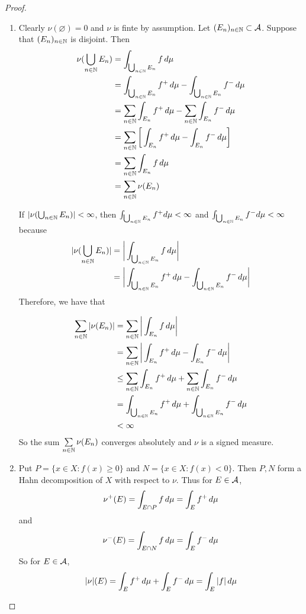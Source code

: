 \documentclass{book}
\begin{document}
	\begin{proof}
		
		\begin{enumerate}
			
			\item Clearly $\nu(\varnothing) = 0$ and $\nu$ is finte by assumption. Let $(E_n)_{n \in \mathbb{N}} \subset \mathcal{A}$. Suppose that $(E_n)_{n \in \mathbb{N}}$ is disjoint. Then 
			\begin{align*}
				\nu(\bigcup_{n \in \mathbb{N}} E_n)
				&= \int_{\bigcup_{n \in \mathbb{N}} E_n} f \, d \mu \\ 
				&= \int_{\bigcup_{n \in \mathbb{N}} E_n} f^+ \, d \mu - \int_{\bigcup_{n \in \mathbb{N}} E_n} f^- \, d \mu\\
				&= \sum\limits_{n \in \mathbb{N}} \int_{ E_n} f^+ \, d \mu - \sum\limits_{n \in \mathbb{N}} \int_{E_n} f^- \, d \mu\\
				&= \sum\limits_{n \in \mathbb{N}} \bigg[ \int_{ E_n} f^+ \, d \mu - \int_{ E_n} f^- \, d \mu \bigg]\\
				&= \sum\limits_{n \in \mathbb{N}} \int_{ E_n} f \, d \mu\\
				&= \sum\limits_{n \in \mathbb{N}} \nu(E_n)
			\end{align*}
			
			If $|\nu(\bigcup_{n \in \mathbb{N}}E_n)| < \infty$, then $ \int_{\bigcup_{n \in \mathbb{N}} E_n} f^+ d  \mu < \infty$ and $ \int_{\bigcup_{n \in \mathbb{N}} E_n} f^- d  \mu < \infty$ because
			\begin{align*}
				|\nu(\bigcup_{n \in \mathbb{N}}E_n)|
				&=\bigg |\int_{\bigcup_{n \in \mathbb{N}} E_n} f \, d \mu\bigg| \\
				&= \bigg |\int_{\bigcup_{n \in \mathbb{N}} E_n} f^+ \, d \mu - \int_{\bigcup_{n \in \mathbb{N}} E_n} f^- \, d \mu \bigg|
			\end{align*} Therefore, we have that
			
			\begin{align*}
				\sum\limits_{n \in \mathbb{N}} |\nu(E_n)|
				&=  \sum\limits_{n \in \mathbb{N}} \bigg|\int_{E_n} f \, d \mu \bigg|\\
				&= \sum\limits_{n \in \mathbb{N}} \bigg| \int_{E_n} f^+ \, d \mu -  \int_{E_n} f^- \, d \mu \bigg|\\
				& \leq \sum\limits_{n \in \mathbb{N}}  \int_{E_n} f^+ \, d \mu  + \sum\limits_{n \in \mathbb{N}}  \int_{E_n} f^- \, d \mu \\
				&= \int_{\bigcup_{n \in \mathbb{N}} E_n} f^+ \, d \mu + \int_{\bigcup_{n \in \mathbb{N}} E_n} f^- \, d \mu\\
				& < \infty
			\end{align*}
			So the sum $\sum\limits_{n \in \mathbb{N}} \nu(E_n)$ converges absolutely and $\nu$ is a signed measure. 
			
			\item Put $P = \{x \in X: f(x) \geq 0\}$ and $N = \{x \in X: f(x) < 0\}$. Then $P,N$ form a Hahn decomposition of $X$ with respect to $\nu$. Thus for $E \in \mathcal{A}$, 
			$$\nu^+(E) = \int_{E \cap P} f \, d \mu = \int_E f^+ \, d \mu$$ and $$\nu^-(E) = \int_{E \cap N} f \, d \mu = \int_E f^- \, d \mu$$
			 So for $E \in \mathcal{A}$, $$|\nu|(E) = \int_E f^+ \, d \mu + \int_E f^- \, d \mu = \int_E |f| \, d \mu$$
		\end{enumerate}
	\end{proof}
	
\end{document}
